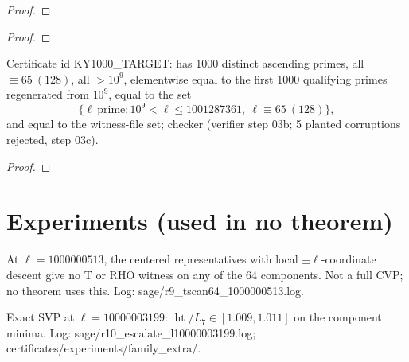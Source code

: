 \begin{proof}\leanok

\end{proof}
\begin{theorem}\label{thm:cert}

\end{theorem}
\begin{proof}

\end{proof}
\begin{lemma}[KY1000 certificates {[C]}]\label{lem:ky1000}

\end{lemma}
\par{}\par
\begin{lemma}\label{lem:ky1000target}
Certificate id KY1000\_TARGET:  has 1000 distinct ascending primes, all $\equiv65\ (128)$, all $>10^9$, elementwise equal to the first 1000 qualifying primes regenerated from $10^9$, equal to the set
\[ \{\ell\ \text{prime}:10^9<\ell\le1001287361,\ \ell\equiv65\ (128)\}, \]
and equal to the witness-file set; checker  (verifier step 03b; 5 planted corruptions rejected, step 03c).
\end{lemma}
\begin{theorem}[Family {[C+L, F-core]}]\label{thm:family}

\end{theorem}
\begin{proof}

\end{proof}

\chapter{Experiments (used in no theorem)}
\begin{lemma}\label{exp:class1}
At $\ell=1000000513$, the centered representatives with local $\pm\ell$-coordinate descent give no T or RHO witness on any of the 64 components. Not a full CVP; no theorem uses this. Log: sage/r9\_tscan64\_1000000513.log.
\end{lemma}
\begin{lemma}\label{exp:svp}
Exact SVP at $\ell=10000003199$: $\operatorname{ht}/L_7\in[1.009,1.011]$ on the component minima. Log: sage/r10\_escalate\_l10000003199.log; certificates/experiments/family\_extra/.
\end{lemma}
